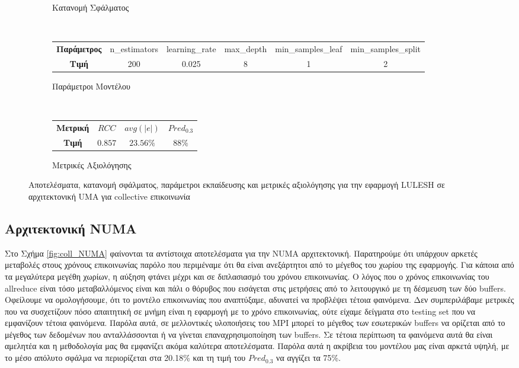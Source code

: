 \begin{figure}[H]
\begin{subfigure}[b]{0.47\textwidth}
        \caption{Κατανομή Σφάλματος}
    \end{subfigure} 
    \\[0.2cm]
    \begin{subfigure}[b]{\textwidth}
   	 	\scriptsize
		\begin{tabular}{c||c|c|c|c|c}
			\textbf{Παράμετρος} & n\_estimators & learning\_rate & max\_depth & min\_samples\_leaf & min\_samples\_split \\
			\textbf{Τιμή}       &       200        &  0.025               & 8          &  1                  &    2
		\end{tabular}
		\caption{Παράμετροι Μοντέλου}
    \end{subfigure}
    \\[0.2cm]
    \begin{subfigure}[b]{\textwidth}
    		\centering
   	 	\scriptsize
		\begin{tabular}{c||c|c|c}
			\textbf{Μετρική} & $RCC$ &   $avg(|e|)$ & $Pred_{0.3}$  \\
			\textbf{Τιμή}  &  $0.857$   &      $23.56\%
			$        &  $88\%$                                         
		\end{tabular}
		\caption{Μετρικές Αξιολόγησης}
    \end{subfigure}
            \caption{Αποτελέσματα, κατανομή σφάλματος, παράμετροι εκπαίδευσης και μετρικές αξιολόγησης για την εφαρμογή LULESH σε αρχιτεκτονική UMA για collective επικοινωνία}
    \label{fig:coll_UMA}
\end{figure}

\subsection{Αρχιτεκτονική NUMA}
Στο Σχήμα \ref{fig:coll_NUMA} φαίνονται τα αντίστοιχα αποτελέσματα για την NUMA αρχιτεκτονική. Παρατηρούμε ότι υπάρχουν αρκετές μεταβολές στους χρόνους επικοινωνίας παρόλο που περιμέναμε ότι θα είναι ανεξάρτητοι από το μέγεθος του χωρίου της εφαρμογής. Για κάποια από τα μεγαλύτερα μεγέθη χωρίων, η αύξηση φτάνει μέχρι και σε διπλασιασμό του χρόνου επικοινωνίας. Ο λόγος που ο χρόνος επικοινωνίας του allreduce είναι τόσο μεταβαλλόμενος είναι και πάλι ο θόρυβος που εισάγεται στις μετρήσεις από το λειτουργικό με τη δέσμευση των δύο buffers. Οφείλουμε να ομολογήσουμε, ότι το μοντέλο επικοινωνίας που αναπτύξαμε, αδυνατεί να προβλέψει τέτοια φαινόμενα. Δεν συμπεριλάβαμε μετρικές που να συσχετίζουν πόσο απαιτητική σε μνήμη είναι η εφαρμογή με το χρόνο επικοινωνίας, ούτε είχαμε δείγματα στο testing set που να εμφανίζουν τέτοια φαινόμενα. Παρόλα αυτά, σε μελλοντικές υλοποιήσεις του MPI μπορεί το μέγεθος των εσωτερικών buffers να ορίζεται από το μέγεθος των δεδομένων που ανταλλάσσονται ή να γίνεται επαναχρησιμοποίηση των buffers. Σε τέτοια περίπτωση τα φαινόμενα αυτά θα είναι αμελητέα και η μεθοδολογία μας θα εμφανίζει ακόμα καλύτερα αποτελέσματα. Παρόλα αυτά η ακρίβεια του μοντέλου μας είναι αρκετά υψηλή, με το μέσο απόλυτο σφάλμα να περιορίζεται στα 20.18\% και τη τιμή του $Pred_{0.3}$ να αγγίζει τα 75\%. 

